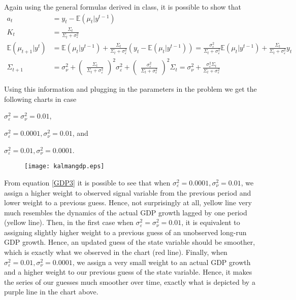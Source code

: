 \documentclass[]{article}
\begin{document}
Again using the general formulas derived in class, it is possible to show that
\begin{align}
	a_t& = y_t - \mathbb{E}(\mu_t|y^{t-1}) \label{GDP1}\\
	K_t& = \frac{\Sigma_t}{\Sigma_t + \sigma_\varepsilon^2} \label{GDP2}\\
	\mathbb{E}(\mu_{t+1}|y^t)& = \mathbb{E}(\mu_t|y^{t-1}) + \frac{\Sigma_t}{\Sigma_t + \sigma_\varepsilon^2}(y_t - \mathbb{E}(\mu_t|y^{t-1})) = \frac{\sigma_\varepsilon^2}{\Sigma_t + \sigma_\varepsilon^2}\mathbb{E}(\mu_t|y^{t-1}) + \frac{\Sigma_t}{\Sigma_t + \sigma_\varepsilon^2}y_t \label{GDP3}\\
	\Sigma_{t+1}& = \sigma_\nu^2 + \begin{pmatrix}\frac{\Sigma_t}{\Sigma_t + \sigma_\varepsilon^2}\end{pmatrix}^2\sigma_\varepsilon^2 + \begin{pmatrix}\frac{\sigma_\varepsilon^2}{\Sigma_t + \sigma_\varepsilon^2}\end{pmatrix}^2\Sigma_t = \sigma_\nu^2 + \frac{\sigma_\varepsilon^2\Sigma_t}{\Sigma_t + \sigma_\varepsilon^2} \label{GDP4}
\end{align}

Using this information and plugging in the parameters in the problem we get the following charts in case \begin{enumerate*}
	\item $\sigma_\varepsilon^2 = \sigma_\nu^2 = 0.01$, 
	\item $\sigma_\varepsilon^2 = 0.0001, \sigma_\nu^2 = 0.01$, and 
	\item $\sigma_\varepsilon^2 = 0.01, \sigma_\nu^2 = 0.0001$.
\end{enumerate*}
\begin{figure}[h]
	\centering
	\texttt{[image: kalmangdp.eps]}
\end{figure}

From equation \eqref{GDP3} it is possible to see that when $\sigma_\varepsilon^2 = 0.0001, \sigma_\nu^2 = 0.01$, we assign a higher weight to observed signal variable from the previous period and lower weight to a previous guess. Hence, not surprisingly at all, yellow line very much resembles the dynamics of the actual GDP growth lagged by one period (yellow line). Then, in the first case when $\sigma_\varepsilon^2 = \sigma_\nu^2 = 0.01$, it is equivalent to assigning slightly higher weight to a previous guess of an unobserved long-run GDP growth. Hence, an updated guess of the state variable should be smoother, which is exactly what we observed in the chart (red line). Finally, when $\sigma_\varepsilon^2 = 0.01, \sigma_\nu^2 = 0.0001$, we assign a very small weight to an actual GDP growth and a higher weight to our previous guess of the state variable. Hence, it makes the series of our guesses much smoother over time, exactly what is depicted by a purple line in the chart above.
\end{document}
